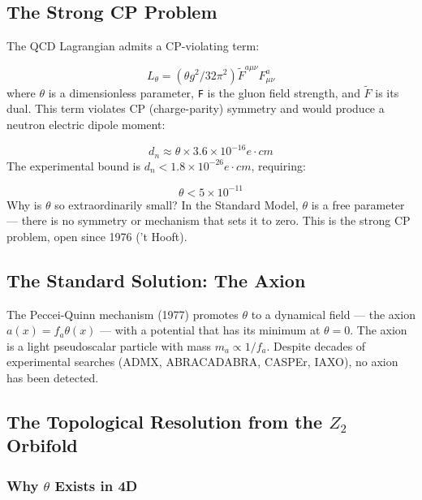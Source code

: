 \documentclass[aps,prd,preprint,superscriptaddress,longbibliography,floatfix]{revtex4-2}
\theoremstyle{remark}
\begin{document}
\subsection{The Strong CP Problem}

The QCD Lagrangian admits a CP-violating term:


\begin{equation}
    L_\theta = (\theta g^{2}/32\pi^{2}) \tilde{F}^{a\mu\nu} F^a_{\mu\nu}
\end{equation}
where $\theta$ is a dimensionless parameter, \texttt{F} is the gluon field strength, and \texttt{$\tilde{F}$} is its dual. This term violates CP (charge-parity) symmetry and would produce a neutron electric dipole moment:


\begin{equation}
    d_n \approx \theta \times 3.6 \times 10^{-16} e\cdot cm
\end{equation}
The experimental bound \cite{Abeletal2020} is $d_n < 1.8 \times 10^{-26} e\cdot cm$, requiring:


\begin{equation}
    \theta < 5 \times 10^{-11}
\end{equation}
Why is $\theta$ so extraordinarily small? In the Standard Model, $\theta$ is a free parameter --- there is no symmetry or mechanism that sets it to zero. This is the strong CP problem, open since 1976 ('t Hooft).


\subsection{The Standard Solution: The Axion}

The Peccei-Quinn mechanism (1977) promotes $\theta$ to a dynamical field --- the axion $a(x) = f_a \theta(x)$ --- with a potential that has its minimum at $\theta = 0$. The axion is a light pseudoscalar particle with mass $m_a \propto 1/f_a$. Despite decades of experimental searches (ADMX, ABRACADABRA, CASPEr, IAXO), no axion has been detected.


\subsection{The Topological Resolution from the $Z_{2}$ Orbifold}


\subsubsection{Why $\theta$ Exists in 4D}
\end{document}
